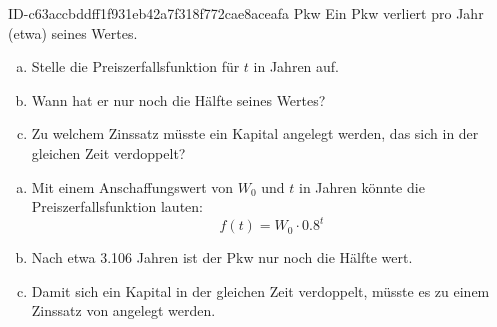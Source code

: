 \begin{exercise}
      {ID-c63accbddff1f931eb42a7f318f772cae8aceafa}
      {Pkw}
  \ifproblem\problem
    Ein Pkw verliert pro Jahr (etwa)  seines Wertes.
    \begin{enumerate}[a)]
      \item Stelle die Preiszerfallsfunktion für $t$ in Jahren auf.
      \item Wann hat er nur noch die Hälfte seines Wertes?
      \item Zu welchem Zinssatz müsste ein Kapital angelegt werden,
            das sich in der gleichen Zeit verdoppelt?
    \end{enumerate}
  \fi
  \ifoutcome\outcome
    \begin{enumerate}[a)]
      \item Mit einem Anschaffungswert von $W_{0}$ und $t$ in Jahren
            könnte die Preiszerfallsfunktion lauten:
            \begin{equation*}
              f(t)=W_{0}\cdot\num{0.8}^{t}
            \end{equation*}
      \item Nach etwa \num{3.106} Jahren ist der Pkw nur
            noch die Hälfte wert.
      \item Damit sich ein Kapital in der gleichen Zeit verdoppelt,
            müsste es zu einem Zinssatz von  angelegt werden.
    \end{enumerate}
  \fi
\end{exercise}

